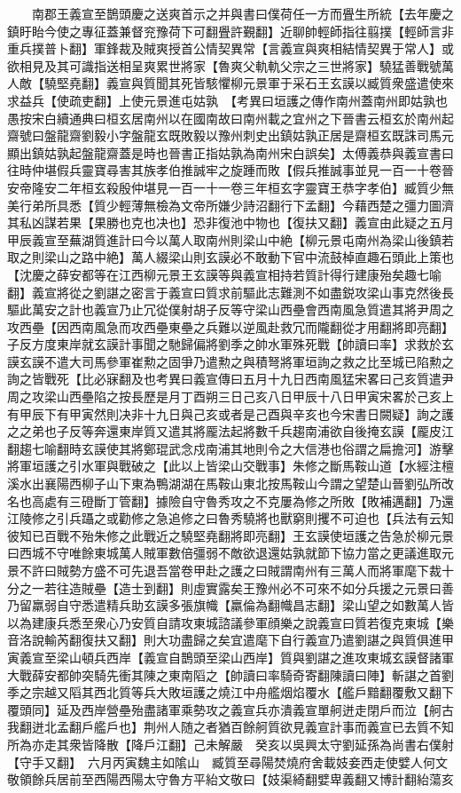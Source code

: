 　　南郡王義宣至鵲頭慶之送爽首示之并與書曰僕荷任一方而舋生所統【去年慶之鎮盱眙今使之專征蓋兼督兖豫荷下可翻舋許覲翻】近聊帥輕師指往翦撲【輕師言非重兵撲普卜翻】軍鋒裁及賊爽授首公情契異常【言義宣與爽相結情契異于常人】或欲相見及其可識指送相呈爽累世將家【魯爽父軌軌父宗之三世將家】驍猛善戰號萬人敵【驍堅堯翻】義宣與質聞其死皆駭懼柳元景軍于采石王玄謨以臧質衆盛遣使來求益兵【使疏吏翻】上使元景進屯姑孰　【考異曰垣護之傳作南州蓋南州即姑孰也愚按宋白續通典曰桓玄居南州以在國南故曰南州載之宜州之下晉書云桓玄於南州起齋號曰盤龍齋劉毅小字盤龍玄既敗毅以豫州刺史出鎮姑孰正居是齋桓玄既誅司馬元顯出鎮姑孰起盤龍齋蓋是時也晉書正指姑孰為南州宋白誤矣】太傅義恭與義宣書曰往時仲堪假兵靈寶尋害其族孝伯推誠牢之旋踵而敗【假兵推誠事並見一百一十卷晉安帝隆安二年桓玄殺殷仲堪見一百一十一卷三年桓玄字靈寶王恭字孝伯】臧質少無美行弟所具悉【質少輕薄無檢為文帝所嫌少詩沼翻行下孟翻】今藉西楚之彊力圖濟其私凶謀若果【果勝也克也决也】恐非復池中物也【復扶又翻】義宣由此疑之五月甲辰義宣至蕪湖質進計曰今以萬人取南州則梁山中絶【柳元景屯南州為梁山後鎮若取之則梁山之路中絶】萬人綴梁山則玄謨必不敢動下官中流鼓棹直趣石頭此上策也【沈慶之薛安都等在江西柳元景王玄謨等與義宣相持若質計得行建康殆矣趣七喻翻】義宣將從之劉諶之密言于義宣曰質求前驅此志難測不如盡鋭攻梁山事克然後長驅此萬安之計也義宣乃止冗從僕射胡子反等守梁山西壘會西南風急質遣其將尹周之攻西壘【因西南風急而攻西壘東壘之兵難以逆風赴救冗而隴翻從才用翻將即亮翻】子反方度東岸就玄謨計事聞之馳歸偏將劉季之帥水軍殊死戰【帥讀曰率】求救於玄謨玄謨不遣大司馬參軍崔勲之固爭乃遣勲之與積弩將軍垣詢之救之比至城已陷勲之詢之皆戰死【比必寐翻及也考異曰義宣傳曰五月十九日西南風猛宋畧曰己亥質遣尹周之攻梁山西壘陷之按長歷是月丁酉朔三日己亥八日甲辰十八日甲寅宋畧於己亥上有甲辰下有甲寅然則决非十九日與己亥或者是己酉與辛亥也今宋書日闕疑】詢之護之之弟也子反等奔還東岸質又遣其將龎法起將數千兵趨南浦欲自後掩玄謨【龎皮江翻趨七喻翻時玄謨使其將鄭琨武念戍南浦其地則令之大信港也俗謂之扁擔河】游擊將軍垣護之引水軍與戰破之【此以上皆梁山交戰事】朱修之斷馬鞍山道【水經注檀溪水出襄陽西柳子山下東為鴨湖湖在馬鞍山東北按馬鞍山今謂之望楚山晉劉弘所改名也高處有三磴斷丁管翻】據險自守魯秀攻之不克屢為修之所敗【敗補邁翻】乃還江陵修之引兵躡之或勸修之急追修之曰魯秀驍將也獸窮則攫不可迫也【兵法有云知彼知已百戰不殆朱修之此戰近之驍堅堯翻將即亮翻】王玄謨使垣護之告急於柳元景曰西城不守唯餘東城萬人賊軍數倍彊弱不敵欲退還姑孰就節下協力當之更議進取元景不許曰賊勢方盛不可先退吾當卷甲赴之護之曰賊謂南州有三萬人而將軍麾下裁十分之一若往造賊壘【造士到翻】則虛實露矣王豫州必不可來不如分兵援之元景曰善乃留羸弱自守悉遣精兵助玄謨多張旗幟【羸倫為翻幟昌志翻】梁山望之如數萬人皆以為建康兵悉至衆心乃安質自請攻東城諮議參軍顔樂之說義宣曰質若復克東城【樂音洛說輸芮翻復扶又翻】則大功盡歸之矣宜遣麾下自行義宣乃遣劉諶之與質俱進甲寅義宣至梁山頓兵西岸【義宣自鵲頭至梁山西岸】質與劉諶之進攻東城玄謨督諸軍大戰薛安都帥突騎先衝其陳之東南䧟之【帥讀曰率騎奇寄翻陳讀曰陣】斬諶之首劉季之宗越又䧟其西北質等兵大敗垣護之燒江中舟艦烟焰覆水【艦戶黯翻覆敷又翻下覆頭同】延及西岸營壘殆盡諸軍乘勢攻之義宣兵亦潰義宣單舸迸走閉戶而泣【舸古我翻迸北孟翻戶艦戶也】荆州人随之者猶百餘舸質欲見義宣計事而義宣已去質不知所為亦走其衆皆降散【降戶江翻】己未解嚴　癸亥以吳興太守劉延孫為尚書右僕射【守手又翻】　六月丙寅魏主如隂山　臧質至尋陽焚燒府舍載妓妾西走使嬖人何文敬領餘兵居前至西陽西陽太守魯方平紿文敬曰【妓渠綺翻嬖卑義翻又博計翻紿蕩亥